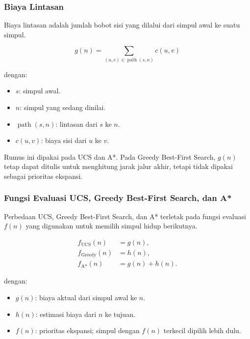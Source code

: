 \subsubsection{Biaya Lintasan}

\begin{jawab}
Biaya lintasan adalah jumlah bobot sisi yang dilalui dari simpul awal ke suatu simpul.
\end{jawab}

\begin{equation}
    g(n)=\sum_{(u,v)\in \operatorname{path}(s,n)} c(u,v)
    \label{eq:rp-path-cost}
\end{equation}

dengan:
\begin{itemize}
    \item $s$: simpul awal.
    \item $n$: simpul yang sedang dinilai.
    \item $\operatorname{path}(s,n)$: lintasan dari $s$ ke $n$.
    \item $c(u,v)$: biaya sisi dari $u$ ke $v$.
\end{itemize}

Rumus ini dipakai pada UCS dan A*. Pada Greedy Best-First Search, $g(n)$ tetap dapat ditulis untuk menghitung jarak jalur akhir, tetapi tidak dipakai sebagai prioritas ekspansi.

\subsubsection{Fungsi Evaluasi UCS, Greedy Best-First Search, dan A*}

\begin{jawab}
Perbedaan UCS, Greedy Best-First Search, dan A* terletak pada fungsi evaluasi $f(n)$ yang digunakan untuk memilih simpul hidup berikutnya.
\end{jawab}

\begin{align}
    f_{\text{UCS}}(n) &= g(n), \label{eq:rp-ucs}\\
    f_{\text{Greedy}}(n) &= h(n), \label{eq:rp-greedy}\\
    f_{\text{A*}}(n) &= g(n)+h(n). \label{eq:rp-astar}
\end{align}

dengan:
\begin{itemize}
    \item $g(n)$: biaya aktual dari simpul awal ke $n$.
    \item $h(n)$: estimasi biaya dari $n$ ke tujuan.
    \item $f(n)$: prioritas ekspansi; simpul dengan $f(n)$ terkecil dipilih lebih dulu.
\end{itemize}

